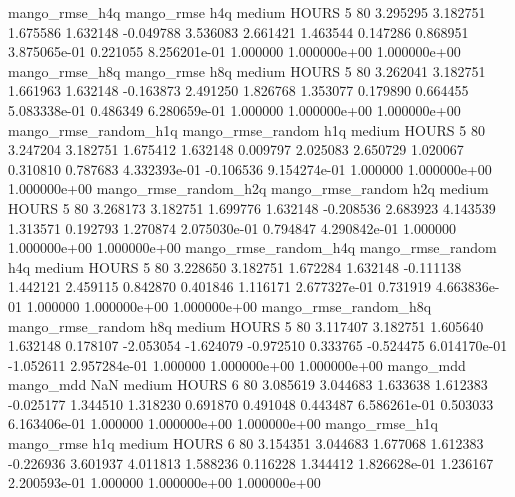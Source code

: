        mango_rmse_h4q        mango_rmse                  h4q     medium    HOURS                 5 80  3.295295       3.182751 1.675586       1.632148   -0.049788      3.536083      2.661421     1.463544       0.147286  0.868951 3.875065e-01     0.221055   8.256201e-01            1.000000    1.000000e+00        1.000000e+00
       mango_rmse_h8q        mango_rmse                  h8q     medium    HOURS                 5 80  3.262041       3.182751 1.661963       1.632148   -0.163873      2.491250      1.826768     1.353077       0.179890  0.664455 5.083338e-01     0.486349   6.280659e-01            1.000000    1.000000e+00        1.000000e+00
mango_rmse_random_h1q mango_rmse_random                  h1q     medium    HOURS                 5 80  3.247204       3.182751 1.675412       1.632148    0.009797      2.025083      2.650729     1.020067       0.310810  0.787683 4.332393e-01    -0.106536   9.154274e-01            1.000000    1.000000e+00        1.000000e+00
mango_rmse_random_h2q mango_rmse_random                  h2q     medium    HOURS                 5 80  3.268173       3.182751 1.699776       1.632148   -0.208536      2.683923      4.143539     1.313571       0.192793  1.270874 2.075030e-01     0.794847   4.290842e-01            1.000000    1.000000e+00        1.000000e+00
mango_rmse_random_h4q mango_rmse_random                  h4q     medium    HOURS                 5 80  3.228650       3.182751 1.672284       1.632148   -0.111138      1.442121      2.459115     0.842870       0.401846  1.116171 2.677327e-01     0.731919   4.663836e-01            1.000000    1.000000e+00        1.000000e+00
mango_rmse_random_h8q mango_rmse_random                  h8q     medium    HOURS                 5 80  3.117407       3.182751 1.605640       1.632148    0.178107     -2.053054     -1.624079    -0.972510       0.333765 -0.524475 6.014170e-01    -1.052611   2.957284e-01            1.000000    1.000000e+00        1.000000e+00
            mango_mdd         mango_mdd                  NaN     medium    HOURS                 6 80  3.085619       3.044683 1.633638       1.612383   -0.025177      1.344510      1.318230     0.691870       0.491048  0.443487 6.586261e-01     0.503033   6.163406e-01            1.000000    1.000000e+00        1.000000e+00
       mango_rmse_h1q        mango_rmse                  h1q     medium    HOURS                 6 80  3.154351       3.044683 1.677068       1.612383   -0.226936      3.601937      4.011813     1.588236       0.116228  1.344412 1.826628e-01     1.236167   2.200593e-01            1.000000    1.000000e+00        1.000000e+00
